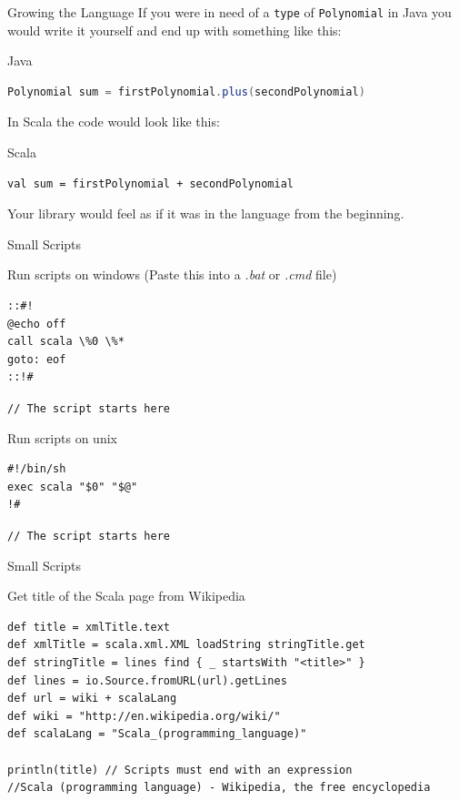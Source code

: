 \begin{frame}[fragile]{Growing the Language}
If you were in need of a \lstinline!type! of \lstinline!Polynomial! in Java you
would write it yourself and end up with something like this:
\begin{exampleblock}{Java}
\begin{lstlisting}[language=java]
Polynomial sum = firstPolynomial.plus(secondPolynomial)
\end{lstlisting}
\end{exampleblock}
\pause
In Scala the code would look like this:
\begin{exampleblock}{Scala}
\begin{lstlisting}
val sum = firstPolynomial + secondPolynomial
\end{lstlisting}
\end{exampleblock}
Your library would feel as if it was in the language from the beginning.
\end{frame}

\begin{frame}[fragile]{Small Scripts}
\begin{exampleblock}{Run scripts on windows (Paste this into a \emph{.bat}
or \emph{.cmd} file)}
\begin{verbatim}
::#! 
@echo off 
call scala \%0 \%* 
goto: eof 
::!#
\end{verbatim}
\lstinline!// The script starts here!
\end{exampleblock}
\begin{exampleblock}{Run scripts on unix}
\begin{verbatim}
#!/bin/sh
exec scala "$0" "$@"
!#
\end{verbatim}
\lstinline!// The script starts here!
\end{exampleblock}
\end{frame}

\begin{frame}[fragile]{Small Scripts}
\begin{exampleblock}{Get title of the Scala page from Wikipedia}
\begin{lstlisting}
def title = xmlTitle.text
def xmlTitle = scala.xml.XML loadString stringTitle.get
def stringTitle = lines find { _ startsWith "<title>" }
def lines = io.Source.fromURL(url).getLines
def url = wiki + scalaLang
def wiki = "http://en.wikipedia.org/wiki/"
def scalaLang = "Scala_(programming_language)"

println(title) // Scripts must end with an expression
//Scala (programming language) - Wikipedia, the free encyclopedia
\end{lstlisting}
\end{exampleblock}
\end{frame}

